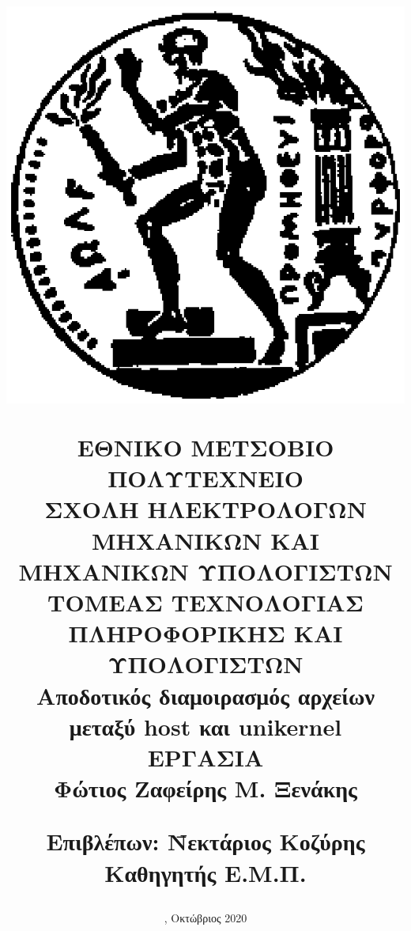 \documentclass[12pt, a4paper, notitlepage]{report}
\newcommand{\en}[1]{\foreignlanguage{english}{#1}}
\newcommand{\host}{\en{host}}
\begin{document}
\title{
	\vspace*{-8ex}
	\begin{center}
		\includegraphics[scale=0.4]{pyrforos.eps}
	\end{center}
	\Large{Ε}\large{ΘΝΙΚΟ}
	\Large{Μ}\large{ΕΤΣΟΒΙΟ}
	\Large{Π}\large{ΟΛΥΤΕΧΝΕΙΟ} \\
	\normalsize{Σ}\small{ΧΟΛΗ}
	\normalsize{Η}\small{ΛΕΚΤΡΟΛΟΓΩΝ}
	\normalsize{Μ}\small{ΗΧΑΝΙΚΩΝ}
	\normalsize{Κ}\small{ΑΙ}
	\normalsize{Μ}\small{ΗΧΑΝΙΚΩΝ}
	\normalsize{Υ}\small{ΠΟΛΟΓΙΣΤΩΝ} \\
	\vspace{2ex}
	\normalsize{Τ}\small{ΟΜΕΑΣ}
	\normalsize{Τ}\small{ΕΧΝΟΛΟΓΙΑΣ}
	\normalsize{Π}\small{ΛΗΡΟΦΟΡΙΚΗΣ}
	\normalsize{Κ}\small{ΑΙ}
	\normalsize{Υ}\small{ΠΟΛΟΓΙΣΤΩΝ} \\
	\vspace{14ex}
	\large\textbf{Αποδοτικός διαμοιρασμός αρχείων μεταξύ \host{} και \en{unikernel}} \\
	\vspace{14ex}
	 ΕΡΓΑΣΙΑ \\
	\vspace{1ex}
	\center\textbf{Φώτιος Ζαφείρης Μ. Ξενάκης}
	\vfill
	\begin{tabbing}
		\normalsize
		\textbf{Επιβλέπων}: \= Νεκτάριος Κοζύρης \\
							\> Καθηγητής Ε.Μ.Π.
	\end{tabbing}
}
\author{}	%
\date{
	, Οκτώβριος 2020
}
\maketitle
\thispagestyle{empty}
\end{document}
